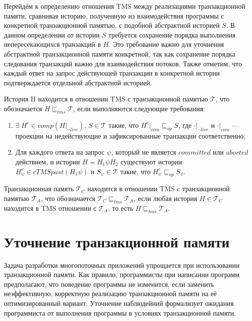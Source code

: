 Перейдём к определению отношения TMS между реализациями транзакционной памяти, сравнивая историю, полученную из взаимодействия программы с конкретной транзакционной памятью, с подобной абстрактной историей $S$. В данном определении от истории $S$ требуется сохранение порядка выполнения непересекающихся транзакций в $H$. Это требование важно для уточнения абстрактной транзакционной памяти конкретной, так как сохранение порядка следования транзакций важно для взаимодействия потоков. Также отметим, что каждый ответ на запрос действующей транзакции в конкретной истории подтверждается отдельной абстрактной историей.
\begin{mydefinition}\label{tms}
История H находится в отношении TMS с транзакционной памятью $\mathcal{T}$, что обозначается $H \sqsubseteq_{tms} \mathcal{T}$, если выполняются следующие требования:
\begin{enumerate}[label = (\roman*)]
\item $\exists \; H^c \in comp(H|_{\neg live})$, $S \in \mathcal{T}$ такие, что $H^c|_{com} \sqsubseteq_{op} S$, где $\cdot|_{\neg live}$ и $\cdot|_{com}$ --- проекции на недействующие и зафиксированные транзакции соответственно;
\item Для каждого ответа на запрос $\psi$, который не является $committed$ или $aborted$ действием, и истории $H = H_1\psi{H_2}$ существуют истории $H^c_{\psi} \in cTMSpast(H_1\psi)$ и $S_{\psi} \in \mathcal{T}$ такие, что $H^c_{\psi} \sqsubseteq_{op} S_{\psi}$. 
\end{enumerate}
Транзакционная память $\mathcal{T}_C$ находится в отношении TMS c транзакционной памятью $\mathcal{T}_A$, что обозначается $\mathcal{T}_C \sqsubseteq_{tms} \mathcal{T}_A$, если любая история $H \in \mathcal{T}_C$ находится в TMS отношении с $\mathcal{T}_A$, то есть $H \sqsubseteq_{tms} \mathcal{T}_{A}$.
\end{mydefinition}

\section{Уточнение транзакционной памяти}
Задача разработки многопоточных приложений упрощается при использовании транзакционной памяти. Как правило, программисты при написании программ предполагают, что поведение программы не изменится, если заменить неэффективную, корректную реализацию транзакционной памяти на её оптимизированный вариант. Уточнение наблюдейний формализует ожидания программиста от выполнения программы в условиях транзакционной памяти.

